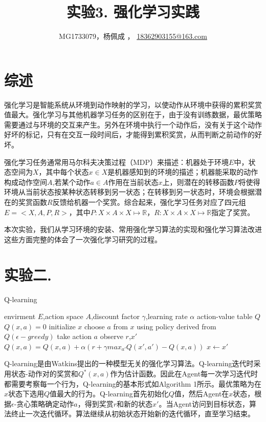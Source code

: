 \documentclass[a4paper,UTF8]{article}
\theoremstyle{definition}
\renewcommand{\algorithmicrequire}{\textbf{Input:}}
\renewcommand{\algorithmicensure}{\textbf{Procedure:}}
\begin{document}
\title{实验3. 强化学习实践}
\author{MG1733079，杨佩成 ， \url{18362903155@163.com}}
\maketitle

\section*{综述}
	强化学习是智能系统从环境到动作映射的学习，以使动作从环境中获得的累积奖赏值最大。强化学习与其他机器学习任务的区别在于，由于没有训练数据，最优策略需要通过与环境的交互来产生。另外在环境中执行一个动作后，没有关于这个动作好坏的标记，只有在交互一段时间后，才能得到累积奖赏，从而判断之前动作的好坏。

	强化学习任务通常用马尔科夫决策过程（MDP）来描述：机器处于环境$E$中，状态空间为$X$，其中每个状态$x \in X$是机器感知到的环境的描述；机器能采取的动作构成动作空间$A$,若某个动作$a \in A$作用在当前状态$x$上，则潜在的转移函数$P$将使得环境从当前状态按某种状态转移到另一状态；在转移到另一状态时，环境会根据潜在的奖赏函数$R$反馈给机器一个奖赏。综合起来，强化学习任务对应了四元组$E=<X,A,P,R>$，其中$P:X \times A \times X \mapsto \mathbb{R}$，$R:X \times A \times X \mapsto \mathbb{R}$指定了奖赏。

	本次实验，我们从学习环境的安装、常用强化学习算法的实现和强化学习算法改进这些方面完整的体会了一次强化学习研究的过程。

\section*{实验二. }
	\begin{algorithm}
	\renewcommand{\algorithmicrequire}{\textbf{Input:}}
	\renewcommand{\algorithmicensure}{\textbf{Output:}}
	\caption{Q-learning}
	\label{alg:1}
	\begin{algorithmic}[1]
		\REQUIRE envirment $E$,action space $A$,discount factor $\gamma$,learning rate $\alpha$
		\ENSURE action-value table $Q$
		\STATE $Q(x,a)=0$
			\STATE initialize $x$
			\REPEAT
			\STATE choose $a$ from $x$ using policy derived from $Q(\epsilon-greedy)$
			\STATE take action $a$ \quad observe $r$,$x'$
			\STATE $Q(x,a)=Q(x,a)+\alpha(r+\gamma max_{a'}Q(x',a')-Q(x,a))$
			\STATE $x\gets x'$
		\ENDFOR
\end{algorithmic}  
\end{algorithm}
	
	Q-learning是由Watkins提出的一种模型无关的强化学习算法。Q-learning迭代时采用状态-动作对的奖赏和$Q^*(x,a)$作为估计函数。因此在Agent每一次学习迭代时都需要考察每一个行为，Q-learning的基本形式如Algorithm 1所示。最优策略为在$x$状态下选用$Q$值最大的行为。Q-learning首先初始化$Q$值，然后Agent在$x$状态，根据$\epsilon$-贪心策略确定动作$a$，得到奖赏$r$和新的状态$x'$。当Agent访问到目标状态，算法终止一次迭代循环。算法继续从初始状态开始新的迭代循环，直至学习结束。
\end{document}
